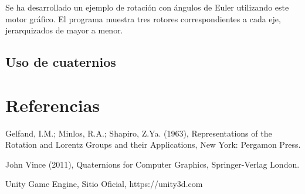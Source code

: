 \documentclass{article}
\theoremstyle{plain}
\theoremstyle{definition}
\theoremstyle{remark}
\begin{document}
Se ha desarrollado un ejemplo de rotación con ángulos de Euler utilizando este motor gráfico. El programa muestra tres rotores correspondientes a cada eje, jerarquizados de mayor a menor.



\subsection{Uso de cuaternios}



\section{Referencias}

\begin{thebibliography}{9}

  Gelfand, I.M.; Minlos, R.A.; Shapiro, Z.Ya. (1963),
  Representations of the Rotation and Lorentz Groups and their Applications,
  New York: Pergamon Press.

  John Vince (2011),
  Quaternions for Computer Graphics,
  Springer-Verlag London.

  Unity Game Engine,
  Sitio Oficial,
  https://unity3d.com

\end{thebibliography}
\end{document}

